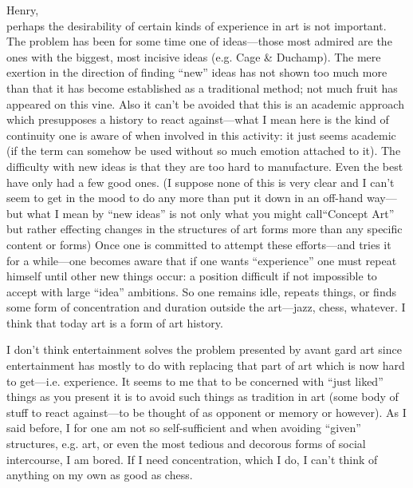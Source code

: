 \clearpage


\vfill \noindentDear Henry, \\perhaps the desirability of certain kinds of experience in art is not important. The problem has been for some time one of ideas---those most admired are the ones with the biggest, most incisive ideas (e.g. Cage \& Duchamp). The mere exertion in the direction of finding \enquote{new} ideas has not shown too much more than that it has become established as a traditional method; not much fruit has appeared on this vine. Also it can't be avoided that this is an academic approach which presupposes a history to react against---what I mean here is the kind of continuity one is aware of when involved in this activity: it just seems academic (if the term can somehow be used without so much emotion attached to it). The difficulty with new ideas is that they are too hard to manufacture. Even the best have only had a few good ones. (I suppose none of this is very clear and I can't seem to get in the mood to do any more than put it down in an off-hand way---but what I mean by \enquote{new ideas} is not only what you might call\enquote{Concept Art} but rather effecting changes in the structures of art forms more than any specific content or forms) Once one is committed to attempt these efforts---and tries it for a while---one becomes aware that if one wants \enquote{experience} one must repeat himself until other new things occur: a position difficult if not impossible to accept with large \enquote{idea} ambitions. So one remains idle, repeats things, or finds some form of concentration and duration outside the art---jazz, chess, whatever. I think that today art is a form of art history. 

I don't think entertainment solves the problem presented by avant gard art since entertainment has mostly to do with replacing that part of art which is now hard to get---i.e. experience. It seems to me that to be concerned with \enquote{just liked} things as you present it is to avoid such things as tradition in art (some body of stuff to react against---to be thought of as opponent or memory or however). As I said before, I for one am not so self-sufficient and when avoiding \enquote{given} structures, e.g. art, or even the most tedious and decorous forms of social intercourse, I am bored. If I need concentration, which I do, I can't think of anything on my own as good as chess. 

